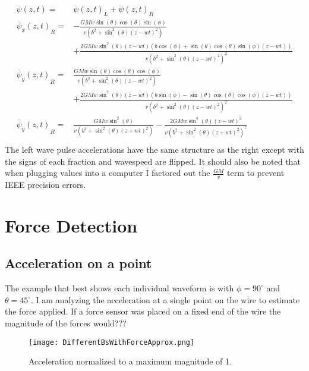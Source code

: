 \documentclass{report}
\begin{document}
\begin{align}
    \ddot{\psi} (z, t) =& {\ddot{\psi} (z, t)}_L + {\ddot{\psi} (z, t)}_R\\
    \nonumber {\ddot{\psi_x} (z, t)}_R =& -\frac{G M w \sin (\theta ) \cos (\theta ) \sin (\phi )}{v \left(b^2+\sin ^2(\theta ) {(z - w t)}^2\right) }\\
    & +\frac{2 G M w \sin ^2(\theta ) (z - w t) (b \cos (\phi )+\sin (\theta ) \cos (\theta ) \sin (\phi ) (z - w t))}{v {\left(b^2+\sin ^2(\theta ) {(z - w t)}^2\right)}^2}\\
    \nonumber {\ddot{\psi_y} (z, t)}_R =& \frac{G M w \sin (\theta ) \cos (\theta ) \cos (\phi )}{v \left(b^2+\sin ^2(\theta ) {(z - w t)}^2\right)}\\
    & +\frac{2 G M w \sin ^2(\theta ) (z - w t) (b \sin (\phi )-\sin (\theta ) \cos (\theta ) \cos (\phi ) (z - w t))}{v {\left(b^2+\sin ^2(\theta ) {(z - w t)}^2\right)}^2} \\
    \nonumber {\ddot{\psi_y} (z, t)}_R =& \frac{G M w \sin ^2(\theta )}{v \left(b^2+\sin ^2(\theta ) {(z + w t)}^2\right)} - \frac{2 G M w \sin ^4(\theta ) {(z - w t)}^2}{v {\left(b^2+\sin ^2(\theta ) {(z + w t)}^2\right)}^2}\\
\end{align} 
The left wave pulse accelerations have the same structure as the right except with the signs of each fraction and wavespeed are flipped. 
It should also be noted that when plugging values into a computer I factored out the $\frac{G M}{v}$ term to prevent IEEE precision errors.


\chapter*{Force Detection}
\section*{Acceleration on a point}
The example that best shows each individual waveform is with $\phi = 90^\circ$ and $\theta = 45^\circ$. I am analyzing the acceleration at a single point on the wire to estimate the force applied. If a force sensor was
placed on a fixed end of the wire the magnitude of the forces would??? %

\begin{figure}[H]
    \texttt{[image: DifferentBsWithForceApprox.png]}
    \caption{Acceleration normalized to a maximum magnitude of 1.}\label{fig:normAcc}
\end{figure}
\end{document}
